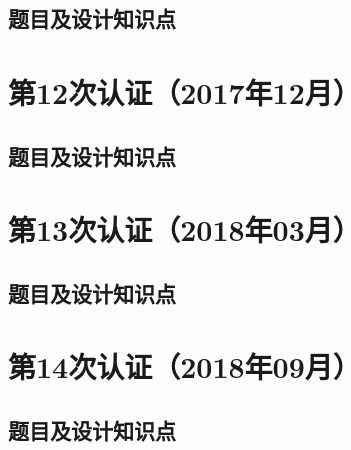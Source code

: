 \documentclass[cn,10pt,math=newtx,citestyle=gb7714-2015,bibstyle=gb7714-2015]{elegantbook}
\begin{document}
\section{题目及设计知识点}











\chapter{第12次认证（2017年12月）}

\section{题目及设计知识点}











\chapter{第13次认证（2018年03月）}

\section{题目及设计知识点}











\chapter{第14次认证（2018年09月）}

\section{题目及设计知识点}
\end{document}
